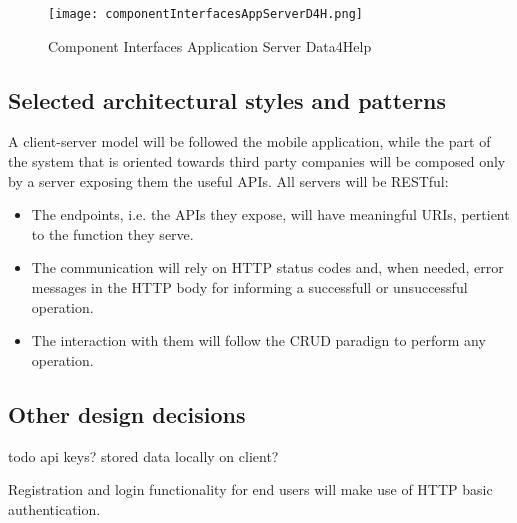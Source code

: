 \documentclass[../main.tex]{subfiles}
\begin{document}
\begin{figure}[H]
        \centering
             \texttt{[image: componentInterfacesAppServerD4H.png]}
              \caption{Component Interfaces Application Server Data4Help }
               \label{fig:componentInterfacesAppServerD4H}
\end{figure}

\vspace*{2cm}


\subsection{Selected architectural styles and patterns}

A client-server model will be followed the mobile application, while the part of the system that is oriented towards third party companies will be composed only by a server exposing them the useful APIs. All servers will be RESTful:
\begin{itemize}
	\item The endpoints, i.e. the APIs they expose, will have meaningful URIs, pertient to the function they serve.
	\item The communication will rely on HTTP status codes and, when needed, error messages in the HTTP body for informing a successfull or unsuccessful operation.
	\item The interaction with them will follow the CRUD paradign to perform any operation.
\end{itemize}


\subsection{Other design decisions}

todo api keys? stored data locally on client?

Registration and login functionality for end users will make use of HTTP basic authentication.
\end{document}
